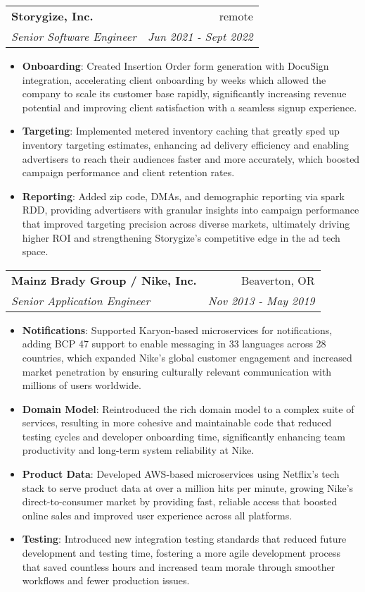 \documentclass[letterpaper,12pt]{article} %
\makeatletter
\newcommand{\resumeItem}[2]{\item\small{\textbf{#1}{: #2}}}
\newcommand{\resumeSubheading}[4]{
  \vspace{-2pt}\item[]
  \begin{tabular*}{\textwidth}{l@{\extracolsep{\fill}}r}
    \textbf{#1} & #2 \\
    \textit{\small#3} & \textit{\small #4} \\
  \end{tabular*}\vspace{0pt}
}
\newcommand{\resumeItemListStart}{\begin{itemize}[itemsep=6pt,topsep=6pt]} %
\newcommand{\resumeItemListEnd}{\end{itemize}}
\makeatother
\begin{document}
  \resumeSubheading{Storygize, Inc.}{remote}{Senior Software Engineer}{Jun 2021 - Sept 2022}
  \resumeItemListStart
    \resumeItem{Onboarding}{Created Insertion Order form generation with DocuSign integration, accelerating client onboarding by weeks which allowed the company to scale its customer base rapidly, significantly increasing revenue potential and improving client satisfaction with a seamless signup experience.}
    \resumeItem{Targeting}{Implemented metered inventory caching that greatly sped up inventory targeting estimates, enhancing ad delivery efficiency and enabling advertisers to reach their audiences faster and more accurately, which boosted campaign performance and client retention rates.}
    \resumeItem{Reporting}{Added zip code, DMAs, and demographic reporting via spark RDD, providing advertisers with granular insights into campaign performance that improved targeting precision across diverse markets, ultimately driving higher ROI and strengthening Storygize’s competitive edge in the ad tech space.}
  \resumeItemListEnd

  \resumeSubheading{Mainz Brady Group / Nike, Inc.}{Beaverton, OR}{Senior Application Engineer}{Nov 2013 - May 2019}
  \resumeItemListStart
    \resumeItem{Notifications}{Supported Karyon-based microservices for notifications, adding BCP 47 support to enable messaging in 33 languages across 28 countries, which expanded Nike’s global customer engagement and increased market penetration by ensuring culturally relevant communication with millions of users worldwide.}
    \resumeItem{Domain Model}{Reintroduced the rich domain model to a complex suite of services, resulting in more cohesive and maintainable code that reduced testing cycles and developer onboarding time, significantly enhancing team productivity and long-term system reliability at Nike.}
    \resumeItem{Product Data}{Developed AWS-based microservices using Netflix’s tech stack to serve product data at over a million hits per minute, growing Nike’s direct-to-consumer market by providing fast, reliable access that boosted online sales and improved user experience across all platforms.}
    \resumeItem{Testing}{Introduced new integration testing standards that reduced future development and testing time, fostering a more agile development process that saved countless hours and increased team morale through smoother workflows and fewer production issues.}
  \resumeItemListEnd
\end{document}
